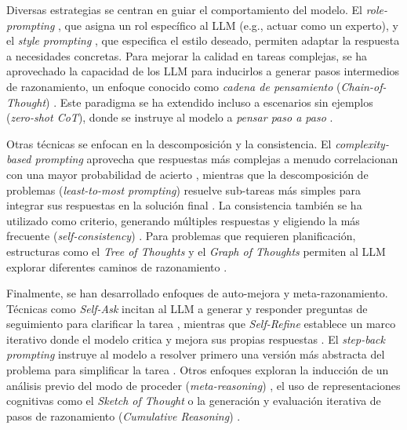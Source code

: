 Diversas estrategias se centran en guiar el comportamiento del modelo. El \textit{role-prompting} \parencite{kongBetterZeroShotReasoning2024}, que asigna un rol específico al LLM (e.g., actuar como un experto), y el \textit{style prompting} \parencite{luBoundingCapabilitiesLarge2023}, que especifica el estilo deseado, permiten adaptar la respuesta a necesidades concretas. Para mejorar la calidad en tareas complejas, se ha aprovechado la capacidad de los LLM para inducirlos a generar pasos intermedios de razonamiento, un enfoque conocido como \textit{cadena de pensamiento} (\textit{Chain-of-Thought}) \parencite{nyeShowYourWork2021, weiChainofThoughtPromptingElicits2023}. Este paradigma se ha extendido incluso a escenarios sin ejemplos (\textit{zero-shot CoT}), donde se instruye al modelo a \textit{pensar paso a paso} \parencite{kojimaLargeLanguageModels2023, wangPlanandSolvePromptingImproving2023}.

Otras técnicas se enfocan en la descomposición y la consistencia. El \textit{complexity-based prompting} aprovecha que respuestas más complejas a menudo correlacionan con una mayor probabilidad de acierto \parencite{fuComplexityBasedPromptingMultiStep2023}, mientras que la descomposición de problemas (\textit{least-to-most prompting}) resuelve sub-tareas más simples para integrar sus respuestas en la solución final \parencite{zhouLeasttoMostPromptingEnables2023}. La consistencia también se ha utilizado como criterio, generando múltiples respuestas y eligiendo la más frecuente (\textit{self-consistency}) \parencite{wangSelfConsistencyImprovesChain2023}. Para problemas que requieren planificación, estructuras como el \textit{Tree of Thoughts} y el \textit{Graph of Thoughts} permiten al LLM explorar diferentes caminos de razonamiento \parencite{yaoTreeThoughtsDeliberate2023, bestaGraphThoughtsSolving2024}.

Finalmente, se han desarrollado enfoques de auto-mejora y meta-razonamiento. Técnicas como \textit{Self-Ask} incitan al LLM a generar y responder preguntas de seguimiento para clarificar la tarea \parencite{pressMeasuringNarrowingCompositionality2023}, mientras que \textit{Self-Refine} establece un marco iterativo donde el modelo critica y mejora sus propias respuestas \parencite{madaanSelfRefineIterativeRefinement2023}. El \textit{step-back prompting} instruye al modelo a resolver primero una versión más abstracta del problema para simplificar la tarea \parencite{zhengTakeStepBack2024}. Otros enfoques exploran la inducción de un análisis previo del modo de proceder (\textit{meta-reasoning}) \parencite{gaoMetaReasoningLarge2024}, el uso de representaciones cognitivas como el \textit{Sketch of Thought} \parencite{aytesSketchofThoughtEfficientLLM2025} o la generación y evaluación iterativa de pasos de razonamiento (\textit{Cumulative Reasoning}) \parencite{zhangCumulativeReasoningLarge2025}.

